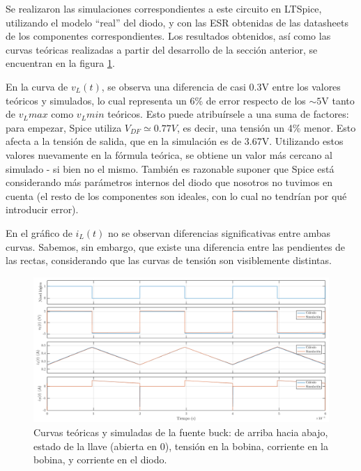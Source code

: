 \documentclass[e4_tp1_main.tex]{subfiles}
\begin{document}
Se realizaron las simulaciones correspondientes a este circuito en LTSpice, utilizando el modelo ``real'' del diodo, y con las ESR obtenidas de las datasheets de los componentes correspondientes. Los resultados obtenidos, as\'i como las curvas te\'oricas realizadas a partir del desarrollo de la secci\'on anterior, se encuentran en la figura \ref{fig:buck-curvas}.

En la curva de $v_L(t)$, se observa una diferencia de casi 0.3V entre los valores te\'oricos y simulados, lo cual representa un 6\% de error respecto de los $\sim5$V tanto de $v_Lmax$ como $v_Lmin$ te\'oricos. Esto puede atribu\'irsele a una suma de factores: para empezar, Spice utiliza $V_{DF} \simeq 0.77V$, es decir, una tensi\'on un 4\% menor. Esto afecta a la tensi\'on de salida, que en la simulaci\'on es de 3.67V. Utilizando estos valores nuevamente en la f\'ormula te\'orica, se obtiene un valor m\'as cercano al simulado - si bien no el mismo. Tambi\'en es razonable suponer que Spice est\'a considerando m\'as par\'ametros internos del diodo que nosotros no tuvimos en cuenta (el resto de los componentes son ideales, con lo cual no tendr\'ian por qu\'e introducir error). 

En el gr\'afico de $i_L(t)$ no se observan diferencias significativas entre ambas curvas. Sabemos, sin embargo, que existe una diferencia entre las pendientes de las rectas, considerando que las curvas de tensi\'on son visiblemente distintas.

\begin{landscape}
	\vspace*{\fill}
	\begin{figure}[ht]
		\centering
		\includegraphics[scale=0.70]{images/ej2/curvas.png}
		\caption{Curvas te\'oricas y simuladas de la fuente buck: de arriba hacia abajo, estado de la llave (abierta en 0), tensi\'on en la bobina, corriente en la bobina, y corriente en el diodo.}
		\label{fig:buck-curvas}
	\end{figure}
	\vspace*{\fill}
\end{landscape}
\end{document}
